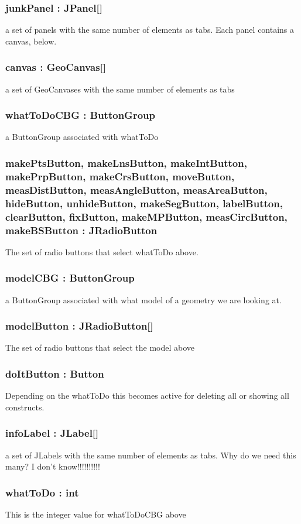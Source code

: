 \documentclass[a4paper,10pt]{report}
\begin{document}
\subsubsection{junkPanel : JPanel[]}a set of panels with the same number of elements as tabs. Each panel contains a canvas, below.
\subsubsection{canvas : GeoCanvas[]} a set of GeoCanvases with the same number of elements as tabs 
\subsubsection{whatToDoCBG : ButtonGroup} a ButtonGroup associated with whatToDo
\subsubsection{makePtsButton, makeLnsButton, makeIntButton, makePrpButton, makeCrsButton, moveButton, measDistButton, measAngleButton, measAreaButton, hideButton, unhideButton, makeSegButton, labelButton, clearButton, fixButton, makeMPButton, measCircButton, makeBSButton : JRadioButton} The set of radio buttons that select whatToDo above.
\subsubsection{modelCBG : ButtonGroup} a ButtonGroup associated with what model of a geometry we are looking at.
\subsubsection{modelButton : JRadioButton[]} The set of radio buttons that select the model above
\subsubsection{doItButton : Button} Depending on the whatToDo this becomes active for deleting all or showing all constructs.
\subsubsection{infoLabel : JLabel[]}a set of JLabels with the same number of elements as tabs.  Why do we need this many?  I don't know!!!!!!!!!!
\subsubsection{whatToDo : int} This is the integer value for whatToDoCBG above
\end{document}
